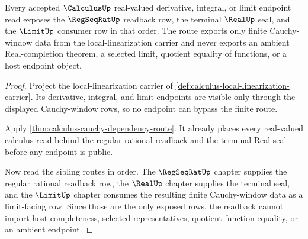 \begin{theorem}
\label{thm:calculus-cauchy-dependency-real-completion-readback}
Every accepted $\CalculusUp$ real-valued derivative, integral, or limit endpoint read exposes the $\RegSeqRatUp$ readback row, the terminal $\RealUp$ seal, and the $\LimitUp$ consumer row in that order. The route exports only finite Cauchy-window data from the local-linearization carrier and never exports an ambient Real-completion theorem, a selected limit, quotient equality of functions, or a host endpoint object.
\end{theorem}
\begin{proof}
Project the local-linearization carrier of \autoref{def:calculus-local-linearization-carrier}. Its derivative, integral, and limit endpoints are visible only through the displayed Cauchy-window rows, so no endpoint can bypass the finite route.

Apply \autoref{thm:calculus-cauchy-dependency-route}. It already places every real-valued calculus read behind the regular rational readback and the terminal Real seal before any endpoint is public.

Now read the sibling routes in order. The $\RegSeqRatUp$ chapter supplies the regular rational readback row, the $\RealUp$ chapter supplies the terminal seal, and the $\LimitUp$ chapter consumes the resulting finite Cauchy-window data as a limit-facing row. Since those are the only exposed rows, the readback cannot import host completeness, selected representatives, quotient-function equality, or an ambient endpoint.
\end{proof}
